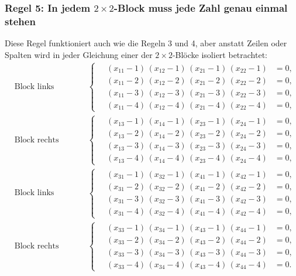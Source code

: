 \subsubsection{Regel 5: In jedem $2 \times 2$-Block muss jede Zahl genau einmal stehen}
Diese Regel funktioniert auch wie die Regeln 3 und 4, aber anstatt Zeilen oder Spalten wird in jeder Gleichung einer der $2 \times 2$-Blöcke isoliert betrachtet:
\begin{align}
&\text{Block links oben:}
&&
\left\{\quad
\begin{aligned}
  (x_{11} - 1)\,(x_{12} - 1)\,(x_{21} - 1)\,(x_{22} - 1) &= 0,\\
  (x_{11} - 2)\,(x_{12} - 2)\,(x_{21} - 2)\,(x_{22} - 2) &= 0,\\
  (x_{11} - 3)\,(x_{12} - 3)\,(x_{21} - 3)\,(x_{22} - 3) &= 0,\\
  (x_{11} - 4)\,(x_{12} - 4)\,(x_{21} - 4)\,(x_{22} - 4) &= 0,
\end{aligned}
\right.
\\
&\text{Block rechts oben:}
&&
\left\{\quad
\begin{aligned}
  (x_{13} - 1)\,(x_{14} - 1)\,(x_{23} - 1)\,(x_{24} - 1) &= 0,\\
  (x_{13} - 2)\,(x_{14} - 2)\,(x_{23} - 2)\,(x_{24} - 2) &= 0,\\
  (x_{13} - 3)\,(x_{14} - 3)\,(x_{23} - 3)\,(x_{24} - 3) &= 0,\\
  (x_{13} - 4)\,(x_{14} - 4)\,(x_{23} - 4)\,(x_{24} - 4) &= 0,
\end{aligned}
\right.
\\
&\text{Block links unten:}
&&
\left\{\quad
\begin{aligned}
  (x_{31} - 1)\,(x_{32} - 1)\,(x_{41} - 1)\,(x_{42} - 1) &= 0,\\
  (x_{31} - 2)\,(x_{32} - 2)\,(x_{41} - 2)\,(x_{42} - 2) &= 0,\\
  (x_{31} - 3)\,(x_{32} - 3)\,(x_{41} - 3)\,(x_{42} - 3) &= 0,\\
  (x_{31} - 4)\,(x_{32} - 4)\,(x_{41} - 4)\,(x_{42} - 4) &= 0,
\end{aligned}
\right.
\\
&\text{Block rechts unten:}
&&
\left\{\quad
\begin{aligned}
  (x_{33} - 1)\,(x_{34} - 1)\,(x_{43} - 1)\,(x_{44} - 1) &= 0,\\
  (x_{33} - 2)\,(x_{34} - 2)\,(x_{43} - 2)\,(x_{44} - 2) &= 0,\\
  (x_{33} - 3)\,(x_{34} - 3)\,(x_{43} - 3)\,(x_{44} - 3) &= 0,\\
  (x_{33} - 4)\,(x_{34} - 4)\,(x_{43} - 4)\,(x_{44} - 4) &= 0.
\end{aligned}
\right.
\label{buchberger:sudoku-gleichung-8}
\end{align}

